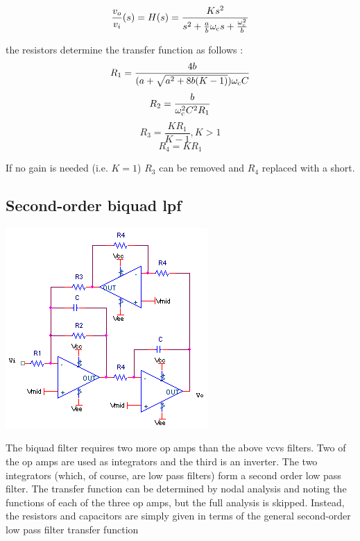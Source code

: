 \textcolor{red}{
\begin{equation}
\frac{\vout}{\vin}(s) = \Hs = \frac{Ks^2}{s^2 + \frac{a}{b}\wcutoff s + \frac{\wcutoff^2}{b}}
\label{eq:2ndorder_vcvs_HPfilter}
\end{equation}
}

the resistors determine the transfer function as follows \autocite[130-131]{op-amp-circuits-johnson}:
\begin{equation}
R_1 = \frac{4b}{(a+\sqrt{a^2 + 8b(K-1)})\omega_\mathrm{c} C}
\end{equation}
\begin{equation}
R_2 = \frac{b}{\omega_\mathrm{c}^2 C^2 R_1}
\end{equation}
\begin{equation}
R_3 = \frac{K R_1}{K-1}, K > 1
\end{equation}
\begin{equation}
R_4 = K R_1
\end{equation}

If no gain is needed (i.e. $K = 1$) $R_3$ can be removed and $R_4$ replaced with a short.

\subsection{Second-order biquad \acl{lpf}}
\begin{center}
	\includegraphics{schematics/2ndorderbiquadLPfilter.PNG}
\end{center}
The biquad filter requires two more op amps than the above \ac{vcvs} filters.
Two of the op amps are used as integrators and the third is an inverter.
The two integrators (which, of course, are low pass filters) form a second order low pass filter.
The transfer function can be determined by nodal analysis and noting the functions of each of the three op amps, but the full analysis is skipped.
Instead, the resistors and capacitors are simply given in terms of the general second-order low pass filter transfer function

